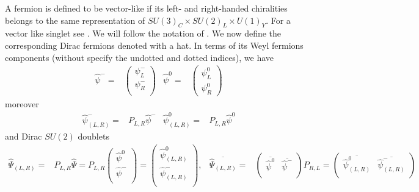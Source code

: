 A fermion is defined to be vector-like if its left- and right-handed chiralities belongs to the same representation of
$SU(3)_C\times SU(2)_L\times U(1)_Y$. For a vector like singlet see \cite{Aoki:2011yk}. We will follow the notation of \cite{Yoshikawa:1995et}.   We now define the corresponding Dirac fermions denoted with a hat. In terms of its Weyl fermions components (without specify the undotted and dotted indices), we have
\begin{align*}
  \widehat{\psi}^-=&
  \begin{pmatrix}
   \psi_{L}^{-}\\
   \psi_{R}^{-}\\
  \end{pmatrix}
&
    \widehat{\psi}^0=&
  \begin{pmatrix}
    \psi_{L}^0\\
    \psi_{R}^0
  \end{pmatrix}
\end{align*}
moreover
\begin{align*}
  \widehat{\psi}_{(L,R)}^-=&P_{L,R}\widehat{\psi}^-&
  \widehat{\psi}_{(L,R)}^0=&P_{L,R}\widehat{\psi}^0
\end{align*}
and Dirac $SU(2)$ doublets
\begin{align*}
  \widehat{\Psi}_{(L,R)}=&P_{L,R}\widehat{\Psi}=P_{L,R}
  \begin{pmatrix}
    \widehat{\psi}^0\\
        \widehat{\psi}^-\\
  \end{pmatrix}=
  \begin{pmatrix}
    \widehat{\psi}^0_{(L,R)}\\
        \widehat{\psi}^-_{(L,R)}\\
  \end{pmatrix},&
  \overline{\widehat{\Psi}_{(L,R)}}=&  \begin{pmatrix}
    \overline{\widehat{\psi}^0}&
        \overline{\widehat{\psi}^-}\\
  \end{pmatrix}P_{R,L}=  \begin{pmatrix}
    \overline{\widehat{\psi}^0_{(L,R)}}&
        \overline{\widehat{\psi}^-_{(L,R)}}\\
  \end{pmatrix}
\end{align*}

